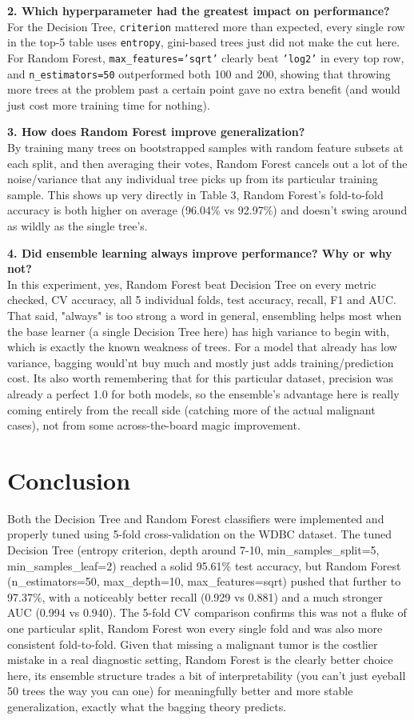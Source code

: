 \documentclass[12pt,a4paper]{article}
\begin{document}
\textbf{2. Which hyperparameter had the greatest impact on performance?}\\
For the Decision Tree, \texttt{criterion} mattered more than expected, every single row in the top-5 table uses \texttt{entropy}, gini-based trees just did not make the cut here. For Random Forest, \texttt{max\_features='sqrt'} clearly beat \texttt{'log2'} in every top row, and \texttt{n\_estimators=50} outperformed both 100 and 200, showing that throwing more trees at the problem past a certain point gave no extra benefit (and would just cost more training time for nothing).

\textbf{3. How does Random Forest improve generalization?}\\
By training many trees on bootstrapped samples with random feature subsets at each split, and then averaging their votes, Random Forest cancels out a lot of the noise/variance that any individual tree picks up from its particular training sample. This shows up very directly in Table 3, Random Forest's fold-to-fold accuracy is both higher on average (96.04\% vs 92.97\%) and doesn't swing around as wildly as the single tree's.

\textbf{4. Did ensemble learning always improve performance? Why or why not?}\\
In this experiment, yes, Random Forest beat Decision Tree on every metric checked, CV accuracy, all 5 individual folds, test accuracy, recall, F1 and AUC. That said, "always" is too strong a word in general, ensembling helps most when the base learner (a single Decision Tree here) has high variance to begin with, which is exactly the known weakness of trees. For a model that already has low variance, bagging would'nt buy much and mostly just adds training/prediction cost. Its also worth remembering that for this particular dataset, precision was already a perfect 1.0 for both models, so the ensemble's advantage here is really coming entirely from the recall side (catching more of the actual malignant cases), not from some across-the-board magic improvement.

\section{Conclusion}
Both the Decision Tree and Random Forest classifiers were implemented and properly tuned using 5-fold cross-validation on the WDBC dataset. The tuned Decision Tree (entropy criterion, depth around 7-10, min\_samples\_split=5, min\_samples\_leaf=2) reached a solid 95.61\% test accuracy, but Random Forest (n\_estimators=50, max\_depth=10, max\_features=sqrt) pushed that further to 97.37\%, with a noticeably better recall (0.929 vs 0.881) and a much stronger AUC (0.994 vs 0.940). The 5-fold CV comparison confirms this was not a fluke of one particular split, Random Forest won every single fold and was also more consistent fold-to-fold. Given that missing a malignant tumor is the costlier mistake in a real diagnostic setting, Random Forest is the clearly better choice here, its ensemble structure trades a bit of interpretability (you can't just eyeball 50 trees the way you can one) for meaningfully better and more stable generalization, exactly what the bagging theory predicts.
\end{document}
